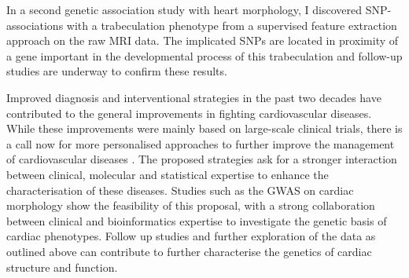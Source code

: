 In a second genetic association study with heart morphology, I discovered SNP-associations with a trabeculation phenotype from a supervised feature extraction approach on the raw MRI data. The implicated SNPs are located in proximity of a gene important in the developmental process of this trabeculation and follow-up studies are underway to confirm these results.

Improved diagnosis and interventional strategies in the past two decades have contributed to the general improvements in fighting cardiovascular diseases. While these improvements were mainly based on large-scale clinical trials, there is a call now for more personalised approaches to further improve the management of cardiovascular diseases \citep{Meder2016}. The proposed strategies ask for a stronger interaction between clinical, molecular and statistical expertise to enhance the characterisation of these diseases. Studies such as the GWAS on cardiac morphology show the feasibility of this proposal, with a strong collaboration between clinical and bioinformatics expertise to investigate the genetic basis of cardiac phenotypes. Follow up studies and further exploration of the data as outlined above can contribute to further characterise the genetics of cardiac structure and function. 



